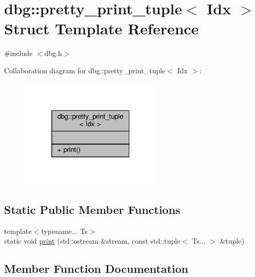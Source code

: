 \hypertarget{structdbg_1_1pretty__print__tuple}{}\section{dbg\+:\+:pretty\+\_\+print\+\_\+tuple$<$ Idx $>$ Struct Template Reference}
\label{structdbg_1_1pretty__print__tuple}


{\ttfamily \#include $<$dbg.\+h$>$}



Collaboration diagram for dbg\+:\+:pretty\+\_\+print\+\_\+tuple$<$ Idx $>$\+:\nopagebreak
\begin{figure}[H]
\begin{center}
\leavevmode
\includegraphics[width=193pt]{dd/da5/structdbg_1_1pretty__print__tuple__coll__graph}
\end{center}
\end{figure}
\subsection*{Static Public Member Functions}
\begin{DoxyCompactItemize}
\item 
{\footnotesize template$<$typename... Ts$>$ }\\static void \hyperlink{structdbg_1_1pretty__print__tuple_a17c2bca6c330e88da2082efa4c3a9be5}{print} (std\+::ostream \&stream, const std\+::tuple$<$ Ts... $>$ \&tuple)
\end{DoxyCompactItemize}


\subsection{Member Function Documentation}
\mbox{\label{structdbg_1_1pretty__print__tuple_a17c2bca6c330e88da2082efa4c3a9be5}} 
